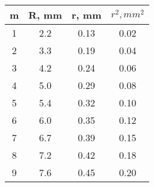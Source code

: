 \begin{tabular}{| c | c | c | c |}
\hline
m&R, mm&r, mm&$r^2, mm^2$\\ \hline
1&2.2&0.13&0.02\\ \hline
2&3.3&0.19&0.04\\ \hline
3&4.2&0.24&0.06\\ \hline
4&5.0&0.29&0.08\\ \hline
5&5.4&0.32&0.10\\ \hline
6&6.0&0.35&0.12\\ \hline
7&6.7&0.39&0.15\\ \hline
8&7.2&0.42&0.18\\ \hline
9&7.6&0.45&0.20\\ \hline
\end{tabular}